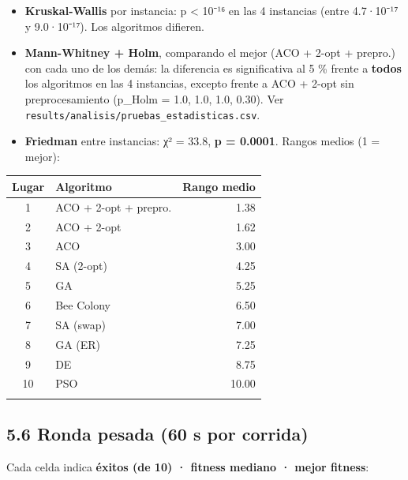 \documentclass[
  spanish,
  11pt,
]{article}
\newcounter{none} %
\providecommand{\tightlist}{%
  \setlength{\itemsep}{0pt}\setlength{\parskip}{0pt}}
\begin{document}
\begin{itemize}
\tightlist
\item
  \textbf{Kruskal-Wallis} por instancia: p \textless{} 10⁻¹⁶ en las 4
  instancias (entre 4.7·10⁻¹⁷ y 9.0·10⁻¹⁷). Los algoritmos difieren.
\item
  \textbf{Mann-Whitney + Holm}, comparando el mejor (ACO + 2-opt +
  prepro.) con cada uno de los demás: la diferencia es significativa al
  5 \% frente a \textbf{todos} los algoritmos en las 4 instancias,
  excepto frente a ACO + 2-opt sin preprocesamiento (p\_Holm = 1.0, 1.0,
  1.0, 0.30). Ver \texttt{results/analisis/pruebas\_estadisticas.csv}.
\item
  \textbf{Friedman} entre instancias: χ² = 33.8, \textbf{p = 0.0001}.
  Rangos medios (1 = mejor):
\end{itemize}

{\def\LTcaptype{none} %
\small
\begin{center}
\begin{tabular}{@{}clr@{}}
\toprule\noalign{}
Lugar & Algoritmo & Rango medio \\
\midrule\noalign{}
1 & ACO + 2-opt + prepro. & 1.38 \\
2 & ACO + 2-opt & 1.62 \\
3 & ACO & 3.00 \\
4 & SA (2-opt) & 4.25 \\
5 & GA & 5.25 \\
6 & Bee Colony & 6.50 \\
7 & SA (swap) & 7.00 \\
8 & GA (ER) & 7.25 \\
9 & DE & 8.75 \\
10 & PSO & 10.00 \\
\bottomrule\noalign{}
\end{tabular}
\end{center}
}

\subsection{5.6 Ronda pesada (60 s por
corrida)}\label{ronda-pesada-60-s-por-corrida}

Cada celda indica \textbf{éxitos (de 10) · fitness mediano · mejor fitness}:
\end{document}
